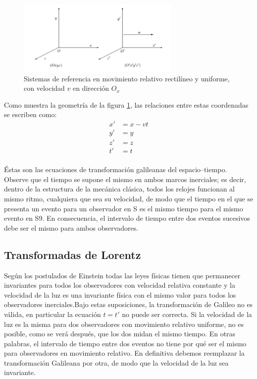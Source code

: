 \documentclass[12pt,twoside]{rif}
\begin{document}
	\begin{figure}[h!]
		\centering
		\includegraphics[width=0.7\textwidth]{img/Galileo.PNG}
		\caption{Sistemas de referencia en movimiento relativo rectilíneo
		y uniforme, con velocidad $v$ en dirección $O_{x}$ }
		\label{fig:01}
		\end{figure}

		Como muestra la geometría de la figura \ref*{fig:01}, las relaciones entre estas coordenadas se escriben 
		como:
		\begin{align*}
			x'&=x-vt\\
			y'&=y\\
			z'&=z\\
			t'&=t\\
		\end{align*}

		Éstas son las ecuaciones de transformación galileanas del espacio–tiempo. Observe que
		el tiempo se supone el mismo en ambos marcos inerciales; es decir, dentro de la estructura de la mecánica clásica, todos los relojes funcionan al mismo ritmo, cualquiera que
		sea su velocidad, de modo que el tiempo en el que se presenta un evento para un observador en S es el mismo tiempo para el mismo evento en S9. En consecuencia, el intervalo
		de tiempo entre dos eventos sucesivos debe ser el mismo para ambos observadores.
\newpage
	\subsection{Transformadas de Lorentz}

	
Según los postulados de Einstein todas las leyes físicas tienen que permanecer 
invariantes para todos los observadores con velocidad relativa constante
y la velocidad de la luz es una invariante física con el mismo valor para todos 
los observadores inerciales.Bajo estas suposiciones, la transformación de Galileo 
no es válida, en particular la ecuación $t = t' $ no puede ser correcta. Si la velocidad de la luz es la
misma para dos observadores con movimiento relativo uniforme, no es posible, 
como se verá después, que los dos midan el mismo tiempo. En otras
palabras, el intervalo de tiempo entre dos eventos no tiene por qué ser el
mismo para observadores en movimiento relativo. En definitiva debemos
reemplazar la transformación Galileana por otra, de modo que la velocidad
de la luz sea invariante.
\end{document}
